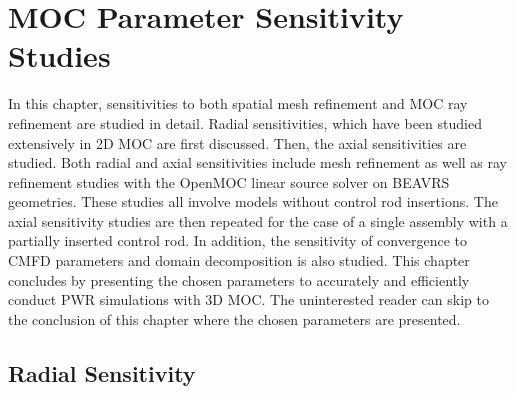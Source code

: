 \chapter{MOC Parameter Sensitivity Studies}
\label{chap:moc-sensitivity}

In this chapter, sensitivities to both spatial mesh refinement and \ac{MOC} ray refinement are studied in detail. Radial sensitivities, which have been studied extensively in 2D \ac{MOC} are first discussed. Then, the axial sensitivities are studied. Both radial and axial sensitivities include mesh refinement as well as ray refinement studies with the OpenMOC linear source solver on BEAVRS geometries. These studies all involve models without control rod insertions. The axial sensitivity studies are then repeated for the case of a single assembly with a partially inserted control rod. In addition, the sensitivity of convergence to \ac{CMFD} parameters and domain decomposition is also studied. This chapter concludes by presenting the chosen parameters to accurately and efficiently conduct \ac{PWR} simulations with 3D \ac{MOC}. The uninterested reader can skip to the conclusion of this chapter where the chosen parameters are presented.


\section{Radial Sensitivity}
\label{sec:radial-sensitivity}

